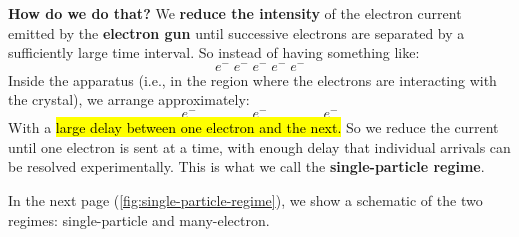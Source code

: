 \highspace
\textcolor{Green3}{ \textbf{How do we do that?}} We \textbf{reduce the intensity} of the electron current emitted by the \textbf{electron gun} until successive electrons are separated by a sufficiently large time interval. So instead of having something like:
\begin{equation*}
    e^- \; e^- \; e^- \; e^- \; e^-
\end{equation*}
Inside the apparatus (i.e., in the region where the electrons are interacting with the crystal), we arrange approximately:
\begin{equation*}
    e^-
    \qquad\qquad
    e^-
    \qquad\qquad
    e^-
\end{equation*}
With a \hl{large delay between one electron and the next.} So we reduce the current until one electron is sent at a time, with enough delay that individual arrivals can be resolved experimentally. This is what we call the \textbf{single-particle regime}.

\highspace
In the next page (\autoref{fig:single-particle-regime}), we show a schematic of the two regimes: single-particle and many-electron.

\newpage

